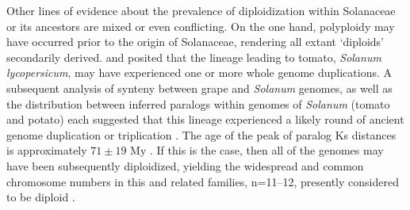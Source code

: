 Other lines of evidence about the prevalence of diploidization within Solanaceae or its ancestors are mixed or even conflicting.
%
On the one hand, polyploidy may have occurred prior to the origin of Solanaceae, rendering all extant `diploids' secondarily derived.
 and \citet{blanc2004} posited that the lineage leading to tomato, \emph{Solanum lycopersicum}, may have experienced one or more whole genome duplications.
A subsequent analysis of synteny between grape and \emph{Solanum} genomes, as well as the distribution between inferred paralogs within genomes of \emph{Solanum} (tomato and potato) each suggested that this lineage experienced a likely round of ancient genome duplication or triplication \citep{tomato2012}. 
The age of the peak of paralog Ks distances is approximately $71 \pm 19$ My \citep{tomato2012}. 
If this is the case, then all of the genomes may have been subsequently diploidized, yielding the widespread and common chromosome numbers in this and related families, n=11--12, presently considered to be diploid \citep{robertson_2011}. 

